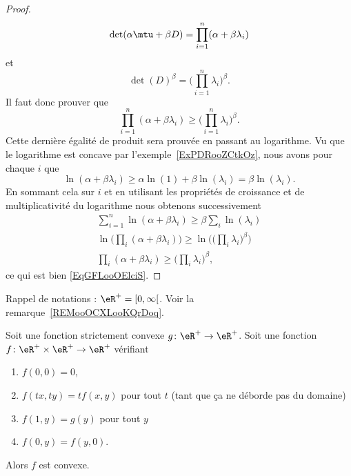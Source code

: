 \begin{proof}
    \begin{equation}
        \det(\alpha\mtu+\beta D)=\prod_{i=1}^n(\alpha+\beta\lambda_i)
    \end{equation}
    et
    \begin{equation}
        \det(D)^{\beta}=\big( \prod_{i=1}^{n}\lambda_i \big)^{\beta}.
    \end{equation}
    Il faut donc prouver que
    \begin{equation}\label{EqGFLooOElciS}
        \prod_{i=1}^n(\alpha+\beta\lambda_i)\geq \big( \prod_{i=1}^n\lambda_i \big)^{\beta}.
    \end{equation}
    Cette dernière égalité de produit sera prouvée en passant au logarithme. Vu que le logarithme est concave par l'exemple~\ref{ExPDRooZCtkOz}, nous avons pour chaque \( i\) que
    \begin{equation}
        \ln(\alpha+\beta\lambda_i)\geq \alpha\ln(1)+\beta\ln(\lambda_i)=\beta\ln(\lambda_i).
    \end{equation}
    En sommant cela sur \( i\) et en utilisant les propriétés de croissance et de multiplicativité du logarithme nous obtenons successivement
    \begin{subequations}
        \begin{align}
            \sum_{i=1}^n\ln(\alpha+\beta\lambda_i)\geq \beta\sum_i\ln(\lambda_i)\\
            \ln\big( \prod_i(\alpha+\beta\lambda_i) \big)\geq\ln\Big( \big( \prod_i\lambda_i \big)^{\beta} \Big)\\
            \prod_i(\alpha+\beta\lambda_i)\geq\big( \prod_i\lambda_i \big)^{\beta},
        \end{align}
    \end{subequations}
    ce qui est bien \eqref{EqGFLooOElciS}.
\end{proof}

Rappel de notations : \( \eR^+=\mathopen[ 0 , \infty \mathclose[\). Voir la remarque~\ref{REMooOCXLooKQrDoq}.
\begin{lemma}        \label{LEMooNUDOooVfVPkw}
    Soit une fonction strictement convexe \( g\colon \eR^+\to \eR^+\). Soit une fonction \( f\colon \eR^+\times \eR^+\to \eR^+\) vérifiant
    \begin{enumerate}
        \item
            \( f(0,0)=0\),
        \item
            \( f(tx,ty)=tf(x,y)\) pour tout \( t\) (tant que ça ne déborde pas du domaine)
        \item
            \( f(1,y)=g(y)\) pour tout \( y\)
        \item
            \( f(0,y)=f(y,0)\).
    \end{enumerate}
    Alors \( f\) est convexe.
\end{lemma}

